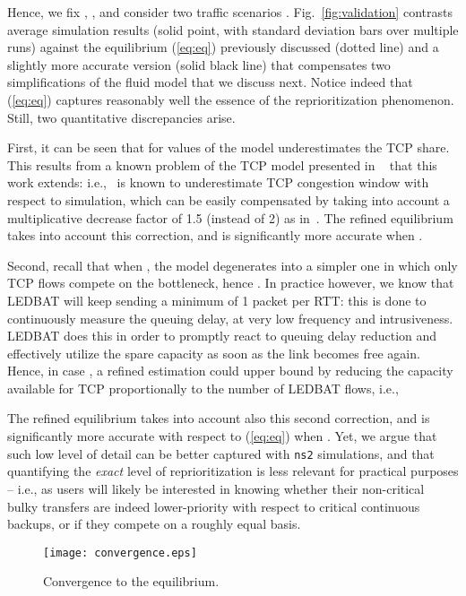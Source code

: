 \documentclass[conference]{IEEEtran}
\newcommand{\eqR}[1]{(\ref{eq:#1})}
\newcommand{\figR}[1]{Fig.~\ref{fig:#1}}
\newcommand{\figLC}[2]{
		\caption{#2}
		\label{fig:#1}
}
\begin{document}
Hence, we fix , ,   and consider two traffic scenarios . \figR{validation} contrasts average simulation results (solid point, with standard deviation bars over multiple runs) against the equilibrium \eqR{eq} previously discussed (dotted line) and a slightly more accurate version (solid black line) that compensates two simplifications of the fluid model that we discuss next. 
Notice indeed that \eqR{eq} captures reasonably well the essence of the reprioritization phenomenon. Still, two quantitative discrepancies arise.

First, it can be seen that for values of  the model underestimates the TCP share. This results from a known  problem of the TCP model presented in ~\cite{liu03sigmetrics} that  this work extends: i.e.,~\cite{liu03sigmetrics} is known to underestimate TCP congestion window with respect to simulation, which can be easily compensated by taking into account a multiplicative decrease factor of 1.5 (instead of 2) as in~\cite{liu03sigmetrics}.
The refined equilibrium takes into account this correction, and is significantly more accurate when .

Second, recall that when , the model degenerates into a simpler one in which only TCP flows compete on the bottleneck, hence . In practice however, we know that LEDBAT will keep sending a minimum of 1 packet per RTT: this is done to continuously measure the queuing delay, at very low frequency and intrusiveness. LEDBAT does this in order to promptly react to queuing delay reduction and effectively utilize the spare capacity as soon as the link becomes free again. Hence, in case , a refined estimation could upper bound  by reducing the capacity available for TCP proportionally to the number of LEDBAT flows, i.e.,  



The refined equilibrium takes into account also this second correction, and is significantly more accurate with respect to \eqR{eq} when  . Yet, we argue that such low level of detail can be better captured with \verb!ns2! simulations, and that quantifying the \emph{exact} level of reprioritization is less relevant for practical purposes -- i.e., as users will likely be interested in knowing whether their non-critical bulky transfers are indeed lower-priority with respect to critical continuous backups, or if they compete on a roughly equal basis.








\begin{figure}[t]
    \begin{center}
        \texttt{[image: convergence.eps]}
        \figLC{convergence}{Convergence to the equilibrium.}
    \end{center}
\end{figure}
\end{document}
